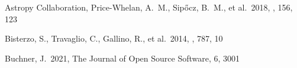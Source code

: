 \documentclass[twocolumn, twocolappendix]{aastex63}
\begin{document}
\begin{thebibliography}{}
 Astropy Collaboration, Price-Whelan, A.~M., Sip{\H{o}}cz, B.~M., et al.\ 2018, \aj, 156, 123


























 Bisterzo, S., Travaglio, C., Gallino, R., et al.\ 2014, \apj, 787, 10




 Buchner, J.\ 2021, The Journal of Open Source Software, 6, 3001



\end{thebibliography}
\end{document}
